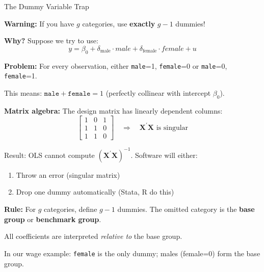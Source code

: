 \documentclass[aspectratio=169, 12pt]{beamer}
\begin{document}
\begin{frame}[shrink=25]{The Dummy Variable Trap}

  \textbf{Warning:} If you have $g$ categories, use \textbf{exactly} $g-1$ dummies!

  \medskip

  \textbf{Why?} Suppose we try to use:
  \[
    y = \beta_0 + \delta_{\text{male}} \cdot \textit{male} + \delta_{\text{female}} \cdot \textit{female} + u
  \]

  \textbf{Problem:} For every observation, either \texttt{male}=1, \texttt{female}=0 or \texttt{male}=0, \texttt{female}=1.

  This means: $\texttt{male} + \texttt{female} = 1$ (perfectly collinear with intercept $\beta_0$).

  \medskip

  \textbf{Matrix algebra:} The design matrix has linearly dependent columns:
  \[
    \begin{bmatrix} 1 & 0 & 1 \\ 1 & 1 & 0 \\ 1 & 1 & 0 \end{bmatrix}
    \quad \Rightarrow \quad
    \mathbf{X}^{\prime} \mathbf{X} \text{ is singular}
  \]

  Result: OLS cannot compute $(\mathbf{X}^{\prime} \mathbf{X})^{-1}$. Software will either:
  \begin{enumerate}
    \item Throw an error (singular matrix)
    \item Drop one dummy automatically (Stata, R do this)
  \end{enumerate}

  \medskip

  \begin{highlightbox}
    \textbf{Rule:} For $g$ categories, define $g-1$ dummies. The omitted category is the \textbf{base group} or \textbf{benchmark group}.

    All coefficients are interpreted \textit{relative to} the base group.
  \end{highlightbox}

  \medskip

  In our wage example: \texttt{female} is the only dummy; males (female=0) form the base group.

\end{frame}
\end{document}
